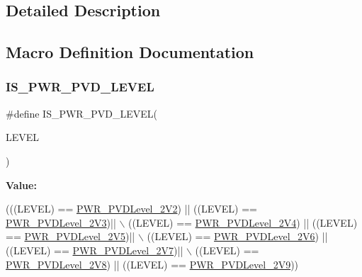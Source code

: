 \subsection{Detailed Description}


\subsection{Macro Definition Documentation}
\mbox{\label{group___p_v_d__detection__level_gabac4485a57abc97aad91eaa0b65ae927}} 
\subsubsection{\texorpdfstring{I\+S\+\_\+\+P\+W\+R\+\_\+\+P\+V\+D\+\_\+\+L\+E\+V\+EL}{IS\_PWR\_PVD\_LEVEL}}
{\footnotesize\ttfamily \#define I\+S\+\_\+\+P\+W\+R\+\_\+\+P\+V\+D\+\_\+\+L\+E\+V\+EL(\begin{DoxyParamCaption}\item[{}]{L\+E\+V\+EL }\end{DoxyParamCaption})}

{\bfseries Value\+:}
\begin{DoxyCode}
(((LEVEL) == \hyperlink{group___p_v_d__detection__level_ga5cf8b09ed099c7412fcee6ccec2ec20b}{PWR\_PVDLevel\_2V2}) || ((LEVEL) == \hyperlink{group___p_v_d__detection__level_ga561e543dedb4c2cb126ec8d9d604260c}{PWR\_PVDLevel\_2V3})|| \(\backslash\)
                                 ((LEVEL) == \hyperlink{group___p_v_d__detection__level_ga5b585e7e6eda29e8b119e16779ba7a8b}{PWR\_PVDLevel\_2V4}) || ((LEVEL) == 
      \hyperlink{group___p_v_d__detection__level_gad91e74c3034a5baccca70250815e680e}{PWR\_PVDLevel\_2V5})|| \(\backslash\)
                                 ((LEVEL) == \hyperlink{group___p_v_d__detection__level_ga46174e5288082b59473068a3ca8e8ea6}{PWR\_PVDLevel\_2V6}) || ((LEVEL) == 
      \hyperlink{group___p_v_d__detection__level_ga72d22a858d8289ef02fff45f4810b916}{PWR\_PVDLevel\_2V7})|| \(\backslash\)
                                 ((LEVEL) == \hyperlink{group___p_v_d__detection__level_ga5f38835a95c026b1db16dbebf81b45a2}{PWR\_PVDLevel\_2V8}) || ((LEVEL) == 
      \hyperlink{group___p_v_d__detection__level_ga9c156a7155f9946c0d3a73794f51a1ce}{PWR\_PVDLevel\_2V9}))
\end{DoxyCode}


